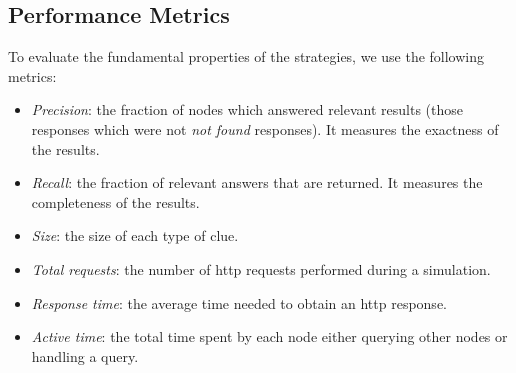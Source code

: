 \subsection{Performance Metrics}
To evaluate the fundamental properties of the strategies, we use the following metrics:
\begin{itemize}
  \item \textit{Precision}: the fraction of nodes which answered relevant results (those responses which were not \textit{not found} responses).
                            It measures the exactness of the results.
  \item \textit{Recall}: the fraction of relevant answers that are returned.
                         It measures the completeness of the results.%
  \item \textit{Size}: the size of each type of clue.
  \item \textit{Total requests}: the number of \acs{http} requests performed during a simulation.
  \item \textit{Response time}: the average time needed to obtain an \acs{http} response.
  \item \textit{Active time}: the total time spent by each node either querying other nodes or handling a query.
\end{itemize}